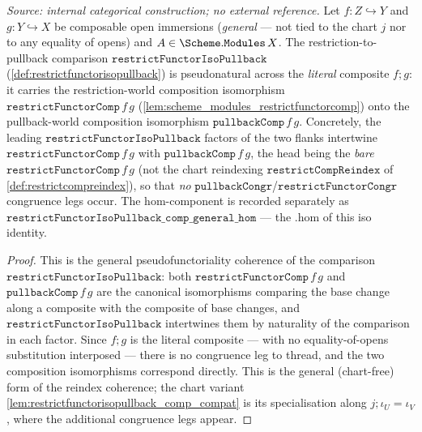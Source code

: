 \begin{lemma}

  \label{lem:restrictfunctorisopullback_comp_general}
  \textit{Source: internal categorical construction; no external reference.}
  Let \(f : Z \hookrightarrow Y\) and \(g : Y \hookrightarrow X\) be composable open immersions
  (\emph{general} --- not tied to the chart \(j\) nor to any equality of opens) and
  \(A \in \Scheme.\mathtt{Modules}\,X\). The restriction-to-pullback comparison
  \(\mathtt{restrictFunctorIsoPullback}\) (\cref{def:restrictfunctorisopullback}) is pseudonatural
  across the \emph{literal} composite \(f \mathbin{;} g\): it carries the restriction-world
  composition isomorphism \(\mathtt{restrictFunctorComp}\,f\,g\)
  (\cref{lem:scheme_modules_restrictfunctorcomp}) onto the pullback-world composition isomorphism
  \(\mathtt{pullbackComp}\,f\,g\). Concretely, the leading
  \(\mathtt{restrictFunctorIsoPullback}\) factors of the two flanks intertwine
  \(\mathtt{restrictFunctorComp}\,f\,g\) with \(\mathtt{pullbackComp}\,f\,g\), the head being the
  \emph{bare} \(\mathtt{restrictFunctorComp}\,f\,g\) (not the chart reindexing
  \(\mathtt{restrictCompReindex}\) of \cref{def:restrictcompreindex}), so that \emph{no}
  \(\mathtt{pullbackCongr}\)/\(\mathtt{restrictFunctorCongr}\) congruence legs occur. The
  \(\mathrm{hom}\)-component is recorded separately as
  \(\mathtt{restrictFunctorIsoPullback\_comp\_general\_hom}\) --- the \(.\mathrm{hom}\) of this iso
  identity.
\end{lemma}
\begin{proof}
  \leanok
  This is the general pseudofunctoriality coherence of the comparison
  \(\mathtt{restrictFunctorIsoPullback}\): both \(\mathtt{restrictFunctorComp}\,f\,g\) and
  \(\mathtt{pullbackComp}\,f\,g\) are the canonical isomorphisms comparing the base change along a
  composite with the composite of base changes, and \(\mathtt{restrictFunctorIsoPullback}\)
  intertwines them by naturality of the comparison in each factor. Since \(f \mathbin{;} g\) is the
  literal composite --- with no equality-of-opens substitution interposed --- there is no congruence
  leg to thread, and the two composition isomorphisms correspond directly. This is the general
  (chart-free) form of the reindex coherence; the chart variant
  \cref{lem:restrictfunctorisopullback_comp_compat} is its specialisation along
  \(j \mathbin{;} \iota_U = \iota_V\), where the additional congruence legs appear.
\end{proof}

